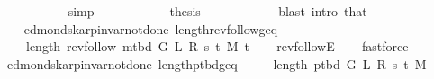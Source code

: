\begin{isabellebody}
\ \ \ \ \ \ \ \ \ \ \isamarkupfalse%
\ simp{\isacharplus}{\kern0pt}\isanewline
\ \ \ \ \ \ \ \ \isamarkupfalse%
\ \isamarkupfalse%
\ {\isacharquery}{\kern0pt}thesis\isanewline
\ \ \ \ \ \ \ \ \ \ \isamarkupfalse%
\ {\isacharparenleft}{\kern0pt}blast\ intro{\isacharcolon}{\kern0pt}\ that{\isacharparenright}{\kern0pt}\isanewline
\ \ \ \ \ \ \isamarkupfalse%
\isanewline
\ \ \ \ \isamarkupfalse%
\isanewline
\ \ \isamarkupfalse%
\isanewline
{}\isamarkupfalse%
%
\endisatagproof
{\isafoldproof}%
%
\isadelimproof
\isanewline
%
\endisadelimproof
%
\isadeliminvisible
\isanewline
%
\endisadeliminvisible
%
\isataginvisible
{}\isamarkupfalse%
\ {\isacharparenleft}{\kern0pt}\ edmonds{\isacharunderscore}{\kern0pt}karp{\isacharunderscore}{\kern0pt}invar{\isacharunderscore}{\kern0pt}not{\isacharunderscore}{\kern0pt}done{\isacharunderscore}{\kern0pt}{}{\isacharparenright}{\kern0pt}\ length{\isacharunderscore}{\kern0pt}rev{\isacharunderscore}{\kern0pt}follow{\isacharunderscore}{\kern0pt}geq{\isacharunderscore}{\kern0pt}{}{\isacharcolon}{\kern0pt}\isanewline
\ \ \ {\isachardoublequoteopen}{}\ {\isasymle}\ length\ {\isacharparenleft}{\kern0pt}rev{\isacharunderscore}{\kern0pt}follow\ {\isacharparenleft}{\kern0pt}m{\isacharunderscore}{\kern0pt}tbd\ G\ L\ R\ s\ t\ M{\isacharparenright}{\kern0pt}\ t{\isacharparenright}{\kern0pt}{\isachardoublequoteclose}%
\endisataginvisible
{\isafoldinvisible}%
%
\isadeliminvisible
\isanewline
%
\endisadeliminvisible
%
\isadelimproof
\ \ %
\endisadelimproof
%
\isatagproof
{}\isamarkupfalse%
\ rev{\isacharunderscore}{\kern0pt}followE\isanewline
\ \ \isamarkupfalse%
\ fastforce%
\endisatagproof
{\isafoldproof}%
%
\isadelimproof
\isanewline
%
\endisadelimproof
%
\isadeliminvisible
\isanewline
%
\endisadeliminvisible
%
\isataginvisible
{}\isamarkupfalse%
\ {\isacharparenleft}{\kern0pt}\ edmonds{\isacharunderscore}{\kern0pt}karp{\isacharunderscore}{\kern0pt}invar{\isacharunderscore}{\kern0pt}not{\isacharunderscore}{\kern0pt}done{\isacharunderscore}{\kern0pt}{}{\isacharparenright}{\kern0pt}\ length{\isacharunderscore}{\kern0pt}p{\isacharunderscore}{\kern0pt}tbd{\isacharunderscore}{\kern0pt}geq{\isacharunderscore}{\kern0pt}{}{\isacharcolon}{\kern0pt}\isanewline
\ \ \ {\isachardoublequoteopen}{}\ {\isasymle}\ length\ {\isacharparenleft}{\kern0pt}p{\isacharunderscore}{\kern0pt}tbd\ G\ L\ R\ s\ t\ M{\isacharparenright}{\kern0pt}{\isachardoublequoteclose}%

\end{isabellebody}
